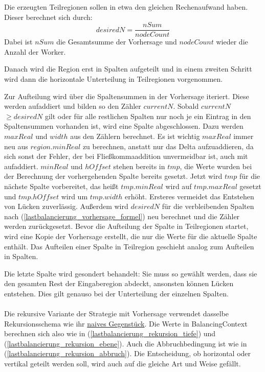 Die erzeugten Teilregionen sollen in etwa den gleichen Rechenaufwand haben. Dieser berechnet sich durch:
\begin{equation} \label{lastbalancierung_vorhersage_formel}
	desiredN = \frac{nSum}{nodeCount}
\end{equation}
Dabei ist $nSum$ die Gesamtsumme der Vorhersage und $nodeCount$ wieder die Anzahl der Worker.

Danach wird die Region erst in Spalten aufgeteilt und in einem zweiten Schritt wird dann die horizontale Unterteilung in Teilregionen vorgenommen. 

Zur Aufteilung wird über die Spaltensummen in der Vorhersage iteriert. Diese werden aufaddiert und bilden so den Zähler $currentN$.
Sobald $currentN$ $\geq desiredN$ gilt oder für alle restlichen Spalten nur noch je ein Eintrag in den Spaltensummen vorhanden ist, wird eine Spalte abgeschlossen.
Dazu werden $maxReal$ und $width$ aus den Zählern berechnet. Es ist wichtig $maxReal$ immer neu aus $region.minReal$ zu berechnen, anstatt nur das Delta aufzuaddieren, da sich sonst der Fehler, der bei Fließkommaaddition unvermeidbar ist, auch mit aufaddiert. $minReal$ und $hOffset$ stehen bereits in $tmp$, die Werte wurden bei der Berechnung der vorhergehenden Spalte bereits gesetzt.
Jetzt wird $tmp$ für die nächste Spalte vorbereitet, das heißt $tmp.minReal$ wird auf $tmp.maxReal$ gesetzt und $tmp.hOffset$ wird um $tmp.width$ erhöht. Ersteres vermeidet das Entstehen von Lücken zuverlässig.
Außerdem wird $desiredN$ für die verbleibenden Spalten nach (\ref{lastbalancierung_vorhersage_formel}) neu berechnet und die Zähler werden zurückgesetzt.
Bevor die Aufteilung der Spalte in Teilregionen startet, wird eine Kopie der Vorhersage erstellt, die nur die Werte für die aktuelle Spalte enthält.
Das Aufteilen einer Spalte in Teilregion geschieht analog zum Aufteilen in Spalten.

Die letzte Spalte wird gesondert behandelt: Sie muss so gewählt werden, dass sie den gesamten Rest der Eingaberegion abdeckt, ansonsten können Lücken entstehen.
Dies gilt genauso bei der Unterteilung der einzelnen Spalten.

\paragraph*{}
Die rekursive Variante der Strategie mit Vorhersage verwendet dasselbe Rekursionsschema wie ihr \hyperref[lastbalancierung_naiv_rekursion]{naives Gegenstück}.
Die Werte in BalancingContext berechnen sich also wie in (\ref{lastbalancierung_rekursion_tiefe}) und (\ref{lastbalancierung_rekursion_ebene}).
Auch die Abbruchbedingung ist wie in (\ref{lastbalancierung_rekursion_abbruch}). Die Entscheidung, ob horizontal oder vertikal geteilt werden soll, wird auch auf die gleiche Art und Weise gefällt.

